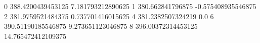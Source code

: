 0 388.4200439453125 7.181793212890625
1 380.662841796875 -0.575408935546875
2 381.9759521484375 0.737701416015625
4 381.2382507324219 0.0
6 390.51190185546875 9.273651123046875
8 396.00372314453125 14.765472412109375
